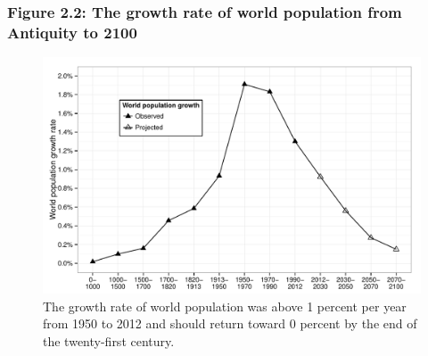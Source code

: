 \documentclass[t]{beamer}\usepackage[]{graphicx}\usepackage[]{color}
\newenvironment{knitrout}{}{} %
\begin{document}
\begin{frame}[label=Figure_2_2]
\frametitle{Figure 2.2: The growth rate of world population from Antiquity to 2100}
\begin{figure}[t]
\begin{minipage}[b]{\textwidth}
\centering
\begin{knitrout}\footnotesize
{}\color{fgcolor}

{\centering \includegraphics[width=1\linewidth]{figures/bw/Figure_2_2} 

}



\end{knitrout}
\caption{The growth rate of world population was above 1 percent per year from 1950 to 2012 and should return toward 0 percent by the end of the twenty-first century.}
\end{minipage}
\end{figure}
\end{frame}
\end{document}
